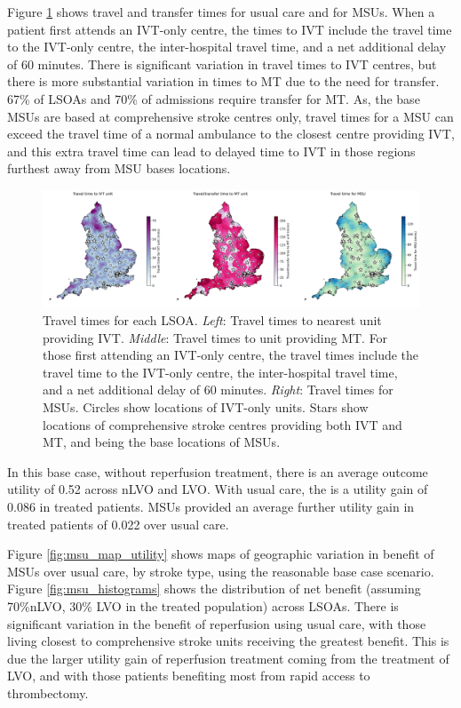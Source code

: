 Figure \ref{fig:map_times} shows travel and transfer times for usual care and for MSUs. When a patient first attends an IVT-only centre, the times to IVT include the travel time to the IVT-only centre, the inter-hospital travel time, and a net additional delay of 60 minutes. There is significant variation in travel times to IVT centres, but there is more substantial variation in times to MT due to the need for transfer. 67\% of LSOAs and 70\% of admissions require transfer for MT. As, the base MSUs are based at comprehensive stroke centres only, travel times for a MSU can exceed the travel time of a normal ambulance to the closest centre providing IVT, and this extra travel time can lead to delayed time to IVT in those regions furthest away from MSU bases locations.

\begin{figure}[h]
    \centering
    \includegraphics[width=1.0\linewidth]{images/map_times.jpg}
    \caption{Travel times for each LSOA. \textit{Left}: Travel times to nearest unit providing IVT. \textit{Middle}: Travel times to unit providing MT. For those first attending an IVT-only centre, the travel times include the travel time to the IVT-only centre, the inter-hospital travel time, and a net additional delay of 60 minutes. \textit{Right}: Travel times for MSUs. Circles show locations of IVT-only units. Stars show locations of comprehensive stroke centres providing both IVT and MT, and being the base locations of MSUs.}
    \label{fig:map_times}
\end{figure}


In this base case, without reperfusion treatment, there is an average outcome utility of 0.52 across nLVO and LVO. With usual care, the is a utility gain of 0.086 in treated patients. MSUs provided an average further utility gain in treated patients of 0.022 over usual care.

Figure \ref{fig:msu_map_utility} shows maps of geographic variation in benefit of MSUs over usual care, by stroke type, using the reasonable base case scenario. Figure \ref{fig:msu_histograms} shows the distribution of net benefit (assuming 70\%nLVO, 30\% LVO in the treated population) across LSOAs. There is significant variation in the benefit of reperfusion using usual care, with those living closest to comprehensive stroke units receiving the greatest benefit. This is due the larger utility gain of reperfusion treatment coming from the treatment of LVO, and with those patients benefiting most from rapid access to thrombectomy.

